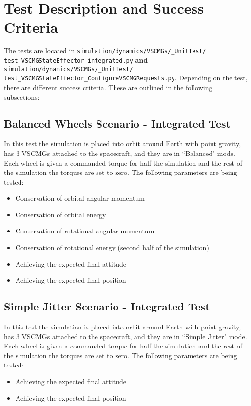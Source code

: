 \section{Test Description and Success Criteria}
The tests are located in \texttt{simulation/dynamics/VSCMGs/\_UnitTest/\newline
test\_VSCMGStateEffector\_integrated.py} \textbf{and} \texttt{simulation/dynamics/VSCMGs/\newline\_UnitTest/
test\_VSCMGStateEffector\_ConfigureVSCMGRequests.py}. Depending on the test, there are different success criteria. These are outlined in the following subsections:
\subsection{Balanced Wheels Scenario - Integrated Test}
In this test the simulation is placed into orbit around Earth with point gravity, has 3 VSCMGs attached to the spacecraft, and they are in ``Balanced" mode. Each wheel is given a commanded torque for half the simulation and the rest of the simulation the torques are set to zero. The following parameters are being tested:
\begin{itemize}
	\item Conservation of orbital angular momentum
	\item Conservation of orbital energy
	\item Conservation of rotational angular momentum
	\item Conservation of rotational energy (second half of the simulation)
	\item Achieving the expected final attitude
	\item Achieving the expected final position
\end{itemize}

\subsection{Simple Jitter Scenario - Integrated Test}
In this test the simulation is placed into orbit around Earth with point gravity, has 3 VSCMGs attached to the spacecraft, and they are in ``Simple Jitter" mode. Each wheel is given a commanded torque for half the simulation and the rest of the simulation the torques are set to zero. The following parameters are being tested:
\begin{itemize}
\item Achieving the expected final attitude
\item Achieving the expected final position
\end{itemize}

